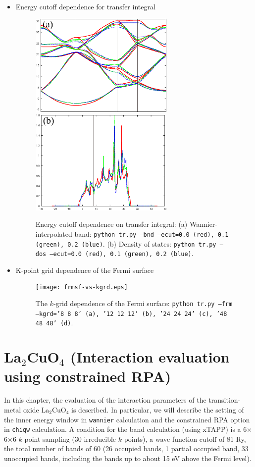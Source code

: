 \documentclass{article}
\begin{document}
\begin{itemize}
\item{Energy cutoff dependence for transfer integral}

\begin{figure}[H] 
\centering
\includegraphics[width=7cm]{band-vs-th.eps}
\includegraphics[width=7cm]{dos-vs-th.eps}
\caption{Energy cutoff dependence on transfer integral: (a) Wannier-interpolated band: \texttt{python tr.py --bnd --ecut=0.0 (red), 0.1 (green), 0.2 (blue)}. (b) Density of states: \texttt{python tr.py --dos --ecut=0.0 (red), 0.1 (green), 0.2 (blue)}.}
\label{band-dos}
\end{figure}

\vspace{10mm}
\item{K-point grid dependence of the Fermi surface}

\begin{figure}[H] 
\centering
\texttt{[image: frmsf-vs-kgrd.eps]}
\caption{The $k$-grid dependence of the Fermi surface: \texttt{python tr.py --frm --kgrd='8 8 8' (a), '12 12 12' (b), '24 24 24' (c), '48 48 48' (d)}.}
\label{frmsf}
\end{figure}
\end{itemize}

\clearpage 

\section{\label{La2CuO4}La$_2$CuO$_4$ (Interaction evaluation using constrained RPA)} 
In this chapter, the evaluation of the interaction parameters of the transition-metal oxide La$_2$CuO$_4$ is described. In particular, we will describe the setting of the inner energy window in {\tt wannier} calculation and the constrained RPA option in {\tt chiqw} calculation. A condition for the band calculation (using {\sc xTAPP}) is a  6$\times$6$\times$6 $k$-point sampling (30 irreducible $k$ points), a wave function cutoff of 81 Ry, the total number of bands of 60 (26 occupied bands, 1 partial occupied band, 33 unoccupied bands, including the bands up to about 15 eV above the Fermi level).
\end{document}
